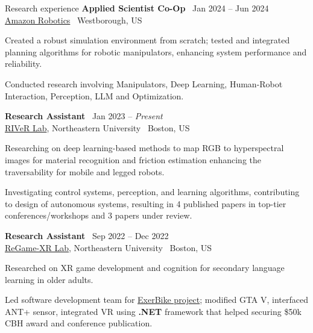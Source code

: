 \documentclass{resume}
\begin{document}
\begin{rSection}{Research experience}
{\bf Applied Scientist Co-Op} \hfill {\ Jan 2024 -- Jun 2024 }\\ 
{\href{https://www.aboutamazon.com/news/tag/robotics}{Amazon Robotics}} \hfill {\ {Westborough, US}}
\begin{cvitems}
    \item Created a robust simulation environment from scratch; tested and integrated planning algorithms for robotic manipulators, enhancing system performance and reliability.
    \item Conducted research involving Manipulators, Deep Learning, Human-Robot Interaction, Perception, LLM and Optimization.
\end{cvitems}
{\bf Research Assistant} \hfill {\ Jan 2023 -- \textit{Present} }\\ 
{\href{https://robot.neu.edu/}{RIVeR Lab}, Northeastern University} \hfill {\ {Boston, US}}
\begin{cvitems}
    \item Researching on deep learning-based methods to map RGB to hyperspectral images for material recognition and friction estimation enhancing the traversability for mobile and legged robots.
    \item Investigating control systems, perception, and learning algorithms, contributing to design of autonomous systems, resulting in 4 published papers in top-tier conferences/workshops and 3 papers under review.
\end{cvitems}
{\bf Research Assistant} \hfill {\ Sep 2022 -- Dec 2022 }\\ 
{\href{https://regamexr.sites.northeastern.edu/}{ReGame-XR Lab}, Northeastern University} \hfill {\ {Boston, US}}
\begin{cvitems}
    \item Researched on XR game development and cognition for secondary language learning in older adults.
    \item Led software development team for \href{https://games.northeastern.edu/project/exerbike/}{ExerBike project}; modified GTA V, interfaced ANT+ sensor, integrated VR using \textbf{.NET} framework that helped securing \$50k CBH award and conference publication.

\end{cvitems}
\end{rSection}
\end{document}
